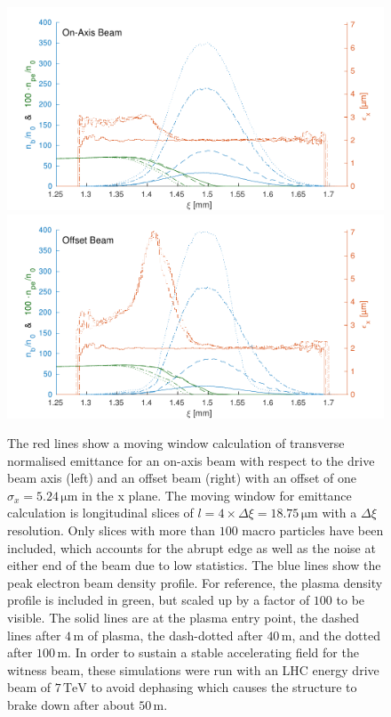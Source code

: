 \documentclass[aps,prstab,reprint,amsmath,amssymb,groupedaddress]{revtex4-1}
\newcommand{\unit}[1]{\,\mathrm{#1}}
\begin{document}
\begin{figure}[hbt]
    \includegraphics[width=0.495\linewidth,trim={2mm 0mm 2mm 0mm},clip]{figures/beamEmittance}
    \includegraphics[width=0.495\linewidth,trim={2mm 0mm 2mm 0mm},clip]{figures/beamEmittanceOffset}
    \caption{\label{Fig:BeamEmitt} The red lines show a moving window calculation of transverse normalised emittance for
        an on-axis beam with respect to the drive beam axis (left) and an offset beam (right) with an offset of one
        $\sigma_{x} = 5.24\unit{\mu m}$ in the x plane. The moving window for emittance calculation is longitudinal
        slices of $l = 4\times\Delta\xi = 18.75\unit{\mu m}$ with a $\Delta\xi$ resolution. Only slices with more than
        $100$ macro particles have been included, which accounts for the abrupt edge as well as the noise at either end
        of the beam due to low statistics. The blue lines show the peak electron beam density profile. For reference,
        the plasma density profile is included in green, but scaled up by a factor of $100$ to be visible. The solid
        lines are at the plasma entry point, the dashed lines after $4\unit{m}$ of plasma, the dash-dotted after
        $40\unit{m}$, and the dotted after $100\unit{m}$. In order to sustain a stable accelerating field for the
        witness beam, these simulations were run with an LHC energy drive beam of $7\unit{TeV}$ to avoid dephasing which
        causes the structure to brake down after about $50\unit{m}$.}
\end{figure}
\end{document}
